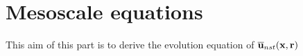 \section{Mesoscale equations}

This aim of this part is to derive the evolution equation of $\overline{\textbf{u}}_{nst}(\textbf{x},\textbf{r})$